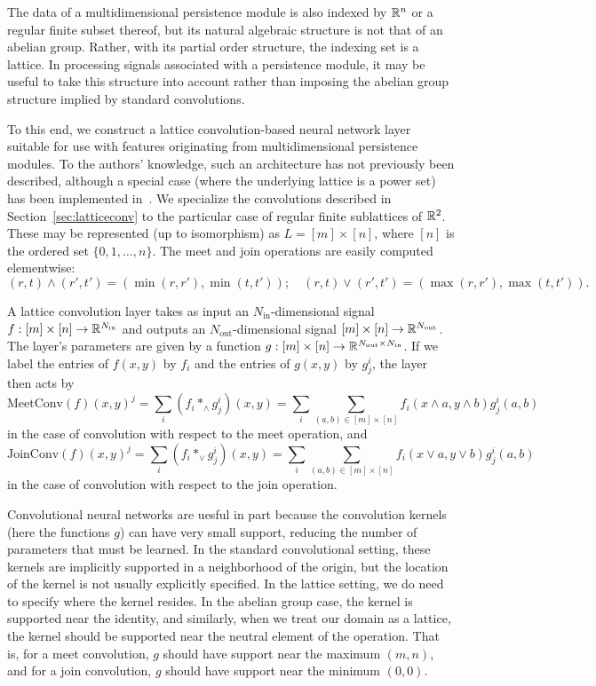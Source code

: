 \documentclass{article}
\begin{document}
The data of a multidimensional persistence module is also indexed by $\mathbb{R}^n$ or a
regular finite subset thereof, but its natural algebraic structure is not that
of an abelian group. Rather, with its partial order structure, the indexing set
is a lattice. In processing signals associated with a persistence module, it
may be useful to take this structure into account rather than imposing the
abelian group structure implied by standard convolutions.

To this end, we construct a lattice convolution-based neural network layer
suitable for use with features originating from multidimensional persistence
modules. To the authors' knowledge, such an architecture has not previously been
described, although a special case (where the underlying lattice is a power set)
has been implemented in~\cite{wendler_powerset_2019}. We specialize the convolutions described in
Section~\ref{sec:latticeconv} to the particular case of regular finite
sublattices of $\mathbb{R}^2$. These may be represented (up to isomorphism) as $L = [m]
\times [n]$, where $[n]$ is the ordered set $\{0,1,\dots,n\}$. The meet and join operations are easily computed
elementwise:
\[(r,t) \wedge (r',t') = (\min(r,r'),\min(t,t'));\quad (r,t)\vee (r',t') =
  (\max(r,r'),\max(t,t')).\]

A lattice convolution layer takes as input an $N_{\text{in}}$-dimensional signal
$f : [m] \times [n] \to \mathbb{R}^{N_{\text{in}}}$ and outputs an
$N_{\text{out}}$-dimensional signal $ [m] \times [n] \to
\mathbb{R}^{N_{\text{out}}}$. The layer's parameters are given by a function $g: [m]
\times [n] \to \mathbb{R}^{N_{\text{out}}\times N_{\text{in}}}$. If we label the
entries of $f(x,y)$ by $f_i$ and the entries of $g(x,y)$ by $g^i_j$, the layer then acts by
\[\text{MeetConv}(f)(x,y)^j = \sum_{i} (f_i \ast_{\wedge} g^i_j)(x,y) = \sum_i
  \sum_{(a,b) \in [m]\times [n]} f_i(x \wedge a, y \wedge b)g^i_j(a,b)\]
in the case of convolution with respect to the meet operation, and
\[\text{JoinConv}(f)(x,y)^j = \sum_{i} (f_i \ast_{\vee} g^i_j)(x,y) = \sum_i
  \sum_{(a,b) \in [m]\times [n]} f_i(x \vee a, y \vee b)g^i_j(a,b)\]
in the case of convolution with respect to the join operation.

Convolutional neural networks are uesful in part because the convolution kernels
(here the functions $g$) can have very small support, reducing the number of
parameters that must be learned. In the standard convolutional setting, these
kernels are implicitly supported in a neighborhood of the origin, but the
location of the kernel is not usually explicitly specified. In the lattice
setting, we do need to specify where the kernel resides. In the abelian group
case, the kernel is supported near the identity, and similarly, 
when we treat our domain as a lattice, the kernel should be supported
near the neutral element of the operation. That is, for a meet convolution, $g$
should have support near the maximum $(m,n)$, and for a join convolution, $g$
should have support near the minimum $(0,0)$.
\end{document}
